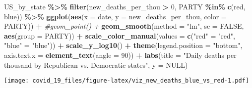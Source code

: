 \documentclass[
]{article}
\newenvironment{Shaded}{\begin{snugshade}}{\end{snugshade}}
\newcommand{\AttributeTok}[1]{\textcolor[rgb]{0.13,0.29,0.53}{#1}}
\newcommand{\CommentTok}[1]{\textcolor[rgb]{0.56,0.35,0.01}{\textit{#1}}}
\newcommand{\ConstantTok}[1]{\textcolor[rgb]{0.56,0.35,0.01}{#1}}
\newcommand{\DecValTok}[1]{\textcolor[rgb]{0.00,0.00,0.81}{#1}}
\newcommand{\FunctionTok}[1]{\textcolor[rgb]{0.13,0.29,0.53}{\textbf{#1}}}
\newcommand{\NormalTok}[1]{#1}
\newcommand{\OtherTok}[1]{\textcolor[rgb]{0.56,0.35,0.01}{#1}}
\newcommand{\SpecialCharTok}[1]{\textcolor[rgb]{0.81,0.36,0.00}{\textbf{#1}}}
\newcommand{\StringTok}[1]{\textcolor[rgb]{0.31,0.60,0.02}{#1}}
\begin{document}
\begin{Shaded}
\begin{Highlighting}[]
\NormalTok{US\_by\_state }\SpecialCharTok{\%\textgreater{}\%}
  \FunctionTok{filter}\NormalTok{(new\_deaths\_per\_thou }\SpecialCharTok{\textgreater{}} \DecValTok{0}\NormalTok{, PARTY }\SpecialCharTok{\%in\%} \FunctionTok{c}\NormalTok{(}\StringTok{\textquotesingle{}red\textquotesingle{}}\NormalTok{, }\StringTok{\textquotesingle{}blue\textquotesingle{}}\NormalTok{)) }\SpecialCharTok{\%\textgreater{}\%}
  \FunctionTok{ggplot}\NormalTok{(}\FunctionTok{aes}\NormalTok{(}\AttributeTok{x =}\NormalTok{ date, }\AttributeTok{y =}\NormalTok{ new\_deaths\_per\_thou, }\AttributeTok{color =}\NormalTok{ PARTY)) }\SpecialCharTok{+}
  \CommentTok{\#geom\_point() +}
  \FunctionTok{geom\_smooth}\NormalTok{(}\AttributeTok{method =} \StringTok{"lm"}\NormalTok{, }\AttributeTok{se =} \ConstantTok{FALSE}\NormalTok{, }\FunctionTok{aes}\NormalTok{(}\AttributeTok{group =}\NormalTok{ PARTY)) }\SpecialCharTok{+}
  \FunctionTok{scale\_color\_manual}\NormalTok{(}\AttributeTok{values =} \FunctionTok{c}\NormalTok{(}\StringTok{"red"} \OtherTok{=} \StringTok{"red"}\NormalTok{, }\StringTok{"blue"} \OtherTok{=} \StringTok{"blue"}\NormalTok{)) }\SpecialCharTok{+}
  \FunctionTok{scale\_y\_log10}\NormalTok{() }\SpecialCharTok{+}
  \FunctionTok{theme}\NormalTok{(}\AttributeTok{legend.position =} \StringTok{"bottom"}\NormalTok{, }\AttributeTok{axis.text.x =} \FunctionTok{element\_text}\NormalTok{(}\AttributeTok{angle =} \DecValTok{90}\NormalTok{)) }\SpecialCharTok{+}
  \FunctionTok{labs}\NormalTok{(}\AttributeTok{title =} \StringTok{"Daily deaths per thousand by Republican vs. Democratic states"}\NormalTok{, }\AttributeTok{y =} \ConstantTok{NULL}\NormalTok{)}
\end{Highlighting}
\end{Shaded}

\texttt{[image: covid\_19\_files/figure-latex/viz\_new\_deaths\_blue\_vs\_red-1.pdf]}
\end{document}
